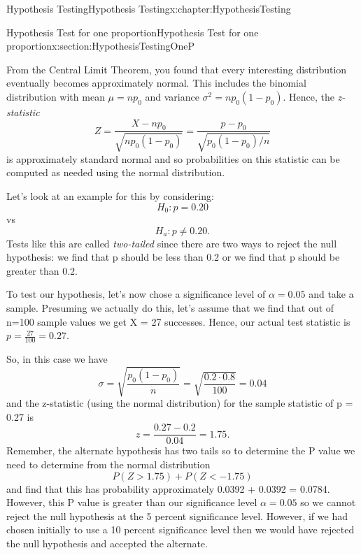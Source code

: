 \documentclass[oneside,10pt,]{book}
\numberwithin{equation}{section}
\newcommand{\lt}{<}
\newcommand{\gt}{>}
\begin{document}
\begin{chapterptx}{Hypothesis Testing}{}{Hypothesis Testing}{}{}{x:chapter:HypothesisTesting}
\begin{sectionptx}{Hypothesis Test for one proportion}{}{Hypothesis Test for one proportion}{}{}{x:section:HypothesisTestingOneP}
\par
From the Central Limit Theorem, you found that every interesting distribution eventually becomes approximately normal. This includes the binomial distribution with mean \(\mu = n p_0\) and variance \(\sigma^2 = n p_0 (1-p_0)\). Hence, the \emph{z-statistic}%
\begin{equation*}
Z = \frac{X - n p_0}{\sqrt{n p_0(1-p_0)}} = \frac{p - p_0}{\sqrt{p_0(1-p_0)/n}}
\end{equation*}
is approximately standard normal and so probabilities on this statistic can be computed as needed using the normal distribution.%
\par
Let's look at an example for this by considering:%
\begin{equation*}
H_0: p = 0.20
\end{equation*}
vs%
\begin{equation*}
H_a: p \ne 0.20.
\end{equation*}
Tests like this are called \emph{two-tailed} since there are two ways to reject the null hypothesis: we find that p should be less than 0.2 or we find that p should be greater than 0.2.%
\par
To test our hypothesis, let's now chose a significance level of \(\alpha = 0.05\) and take a sample. Presuming we actually do this, let's assume that we find that out of n=100 sample values we get X = 27 successes. Hence, our actual test statistic is \(p = \frac{27}{100} = 0.27\).%
\par
So, in this case we have%
\begin{equation*}
\sigma = \sqrt{\frac{p_0(1-p_0)}{n}} = \sqrt{\frac{0.2 \cdot 0.8}{100}} = 0.04
\end{equation*}
and the z-statistic (using the normal distribution) for the sample statistic of p = 0.27 is%
\begin{equation*}
z = \frac{0.27 - 0.2}{0.04} = 1.75.
\end{equation*}
Remember, the alternate hypothesis has two tails so to determine the P value we need to determine from the normal distribution%
\begin{equation*}
P(Z \gt 1.75) + P(Z \lt -1.75)
\end{equation*}
and find that this has probability approximately 0.0392 + 0.0392 = 0.0784.  However, this P value is greater than our significance level \(\alpha = 0.05\) so we cannot reject the null hypothesis at the 5 percent significance level. However, if we had chosen initially to use a 10 percent significance level then we would have rejected the null hypothesis and accepted the alternate.%

\end{sectionptx}
\end{chapterptx}
\end{document}
